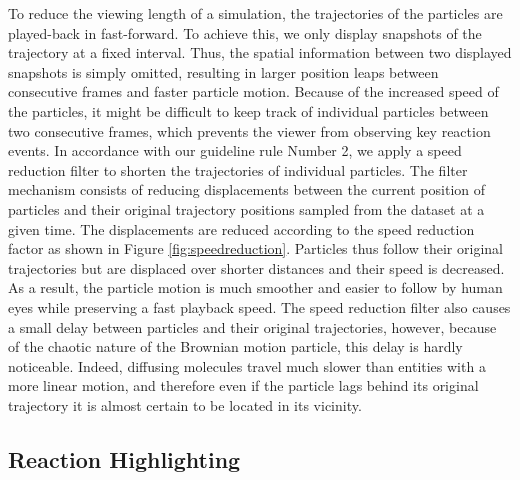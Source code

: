 To reduce the viewing length of a simulation, the trajectories of the particles are played-back in fast-forward.
To achieve this, we only display snapshots of the trajectory at a fixed interval.
Thus, the spatial information between two displayed snapshots is simply omitted, resulting in larger position leaps between consecutive frames and faster particle motion.
Because of the increased speed of the particles, it might be difficult to keep track of individual particles between two consecutive frames, which prevents the viewer from observing key reaction events.
In accordance with our guideline rule Number 2, we apply a speed reduction filter to shorten the trajectories of individual particles.
The filter mechanism consists of reducing displacements between the current position of particles and their original trajectory positions sampled from the dataset at a given time.
The displacements are reduced according to the speed reduction factor as shown in Figure \ref{fig:speedreduction}.
Particles thus follow their original trajectories but are displaced over shorter distances and their speed is decreased.
As a result, the particle motion is much smoother and easier to follow by human eyes while preserving a fast playback speed.
The speed reduction filter also causes a small delay between particles and their original trajectories, however, because of the chaotic nature of the Brownian motion particle, this delay is hardly noticeable.
Indeed, diffusing molecules travel much slower than entities with a more linear motion, and therefore even if the particle lags behind its original trajectory it is almost certain to be located in its vicinity.




\subsection{Reaction Highlighting}

